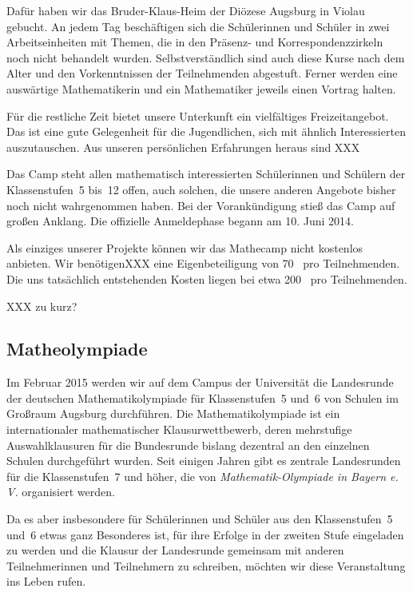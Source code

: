 \documentclass[12pt]{zettel}
\begin{document}
Dafür haben wir das Bruder-Klaus-Heim der Diözese Augsburg in Violau
gebucht. An jedem Tag beschäftigen sich die Schülerinnen und Schüler in zwei
Arbeitseinheiten mit Themen, die in den Präsenz- und Korrespondenzzirkeln noch
nicht behandelt wurden. Selbstverständlich sind auch diese Kurse nach dem Alter
und den Vorkenntnissen der Teilnehmenden abgestuft. Ferner
werden eine auswärtige Mathematikerin und ein Mathematiker jeweils einen
Vortrag halten.

Für die restliche Zeit bietet unsere Unterkunft ein vielfältiges
Freizeitangebot. Das ist eine gute Gelegenheit für die Jugendlichen,
sich mit ähnlich Interessierten auszutauschen. Aus unseren persönlichen
Erfahrungen heraus sind XXX

Das Camp steht allen mathematisch interessierten Schülerinnen und Schülern der
Klassenstufen~5 bis~12 offen, auch solchen, die unsere anderen Angebote bisher
noch nicht wahrgenommen haben. Bei der Vorankündigung stieß das Camp auf großen
Anklang. Die offizielle Anmeldephase begann am 10. Juni 2014.

Als einziges unserer Projekte können wir das Mathecamp nicht kostenlos
anbieten. Wir benötigenXXX eine Eigenbeteiligung von 70~\texteuro{} pro
Teilnehmenden. Die uns tatsächlich entstehenden Kosten liegen bei etwa
200~\texteuro{} pro Teilnehmenden.

XXX zu kurz?


\subsection{Matheolympiade}

Im Februar 2015 werden wir auf dem Campus der Universität die Landesrunde der deutschen
Mathematikolympiade für Klassenstufen~5 und~6 von Schulen im Großraum
Augsburg durchführen. Die Mathematikolympiade ist ein internationaler mathematischer
Klausurwettbewerb, deren mehrstufige Auswahlklausuren für die Bundesrunde
bislang dezentral an den einzelnen Schulen durchgeführt wurden. Seit einigen
Jahren gibt es zentrale Landesrunden für die Klassenstufen~7 und höher, die von
\emph{Mathematik-Olympiade in Bayern e.\,V.} organisiert werden.

Da es aber insbesondere für Schülerinnen und Schüler aus den Klassenstufen~5
und~6 etwas ganz Besonderes ist, für ihre Erfolge in der zweiten Stufe
eingeladen zu werden und die Klausur der Landesrunde gemeinsam mit anderen
Teilnehmerinnen und Teilnehmern zu schreiben, möchten wir diese Veranstaltung
ins Leben rufen.
\end{document}
